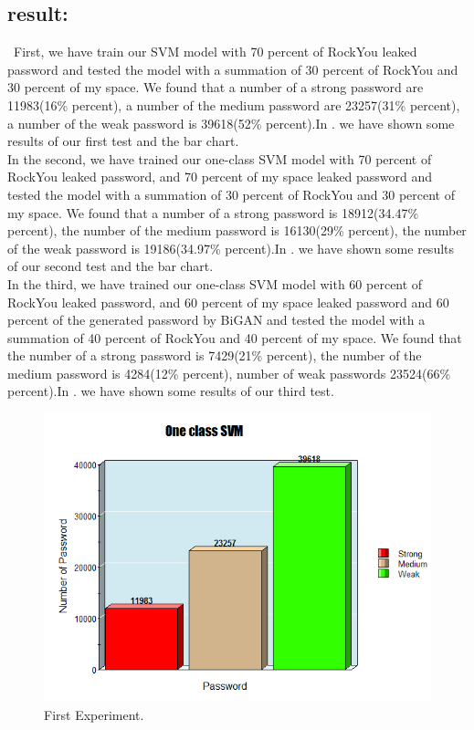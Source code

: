 \documentclass[runningheads]{llncs}
\begin{document}
{\subsection{\textbf{ result:}}{~First, we have train our SVM model with 70 percent of RockYou leaked password and tested the model with a summation of 30 percent of RockYou and 30 percent of my space. We found that a number of a strong password are 11983(16\% percent), a number of the medium password are 23257(31\% percent), a number of the weak password is 39618(52\% percent).In  . we have shown some results of our first test and the bar chart.
\newline
\\
In the second, we have trained our one-class SVM model with 70 percent of RockYou leaked password, and 70 percent of my space leaked password and tested the model with a summation of 30 percent of RockYou and 30 percent of my space. We found that a number of a strong password is 18912(34.47\% percent), the number of the medium password is 16130(29\% percent), the number of the weak password is 19186(34.97\% percent).In  . we have shown some results of our second test and the bar chart.
\newline
\\
In the third, we have trained our one-class SVM model with 60 percent of RockYou leaked password, and 60 percent of my space leaked password and 60 percent of the generated password by BiGAN and tested the model with a summation of 40 percent of RockYou and 40 percent of my space. We found that the number of a strong password is 7429(21\% percent), the number of the medium password is 4284(12\% percent), number of weak passwords 23524(66\% percent).In . we have shown some results of our third test.
\begin{figure}
  \centering
  \begin{minipage}[b]{0.4\textwidth}
  \begin{mdframed}
    \includegraphics[width=\textwidth]{First.png}
   \end{mdframed}
    \caption{First Experiment.}
  

\end{minipage}
\end{figure}}}
\end{document}
